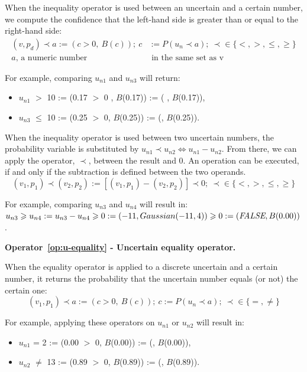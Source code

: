 When the inequality operator is used between an uncertain and a certain number, we compute the confidence that the left-hand side is greater than or equal to the right-hand side:
\begin{align*}
	(v, p_d) \prec a := (c > 0 ,~B(c));~c &:= P(u_n \prec a);~\prec \in \{<,>,\leqslant, \geqslant\}\\
	a \text{, a numeric number}& \text{ in the same set as v}
\end{align*}

For example, comparing $u_{n1}$ and $u_{n3}$ will return:
\begin{itemize}
	\item $u_{n1}$ $>$ 10 := (0.17 $>$ 0 , $B$(0.17)) := (\true{} , $B$(0.17)),
	\item $u_{n3}$ $\leqslant$ 10 := (0.25 $>$ 0, $B$(0.25)) := (\true{}, $B$(0.25)).
\end{itemize}

When the inequality operator is used between two uncertain numbers, the probability variable is substituted by $ u_{n1} \prec u_{n2} \Leftrightarrow u_{n1} - u_{n2}$. 
From there, we can apply the operator, $\prec$, between the result and 0.
An operation can be executed, if and only if the subtraction is defined between the two operands.
$$(v_1, p_1) \prec (v_2, p_2) := [(v_1, p_1) - (v_2, p_2)] \prec 0;~\prec \in \{<,>,\leqslant, \geqslant\}$$

For example, comparing $u_{n3}$ and $u_{n4}$ will result in: $u_{n3} \geqslant u_{n4} := u_{n3} - u_{n4} \geqslant 0 := (-11, Gaussian(-11, 4)) \geqslant 0 := (\textit{FALSE}{}, B(0.00))$.

\bigskip

\noindent\textbf{Operator~\ref{op:u-equality} - Uncertain equality operator.~}

When the equality operator is applied to a discrete uncertain and a certain number, it returns the probability that the uncertain number equals (or not) the certain one:
$$(v_1, p_1) \prec a := (c > 0 ,~B(c));~c := P(u_n \prec a);~\prec \in \{=, \ne\}$$

For example, applying these operators on $u_{n1}$ or $u_{n2}$ will result in:
\begin{itemize}
	\item $u_{n1}$ = 2 := (0.00 $>$ 0, $B$(0.00)) := (\false{}, $B$(0.00)),
	\item $u_{n2}$ $\ne$ 13 :=  (0.89 $>$ 0, $B$(0.89)) := (\true{}, $B$(0.89)).
\end{itemize}

